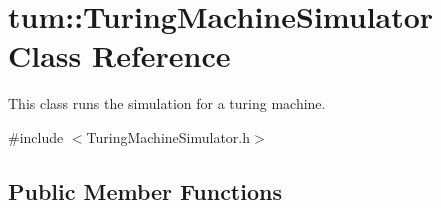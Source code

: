 \hypertarget{classtum_1_1_turing_machine_simulator}{\section{tum\-:\-:\-Turing\-Machine\-Simulator \-Class \-Reference}
\label{classtum_1_1_turing_machine_simulator}
}


\-This class runs the simulation for a turing machine.  




{\ttfamily \#include $<$\-Turing\-Machine\-Simulator.\-h$>$}

\subsection*{\-Public \-Member \-Functions}
